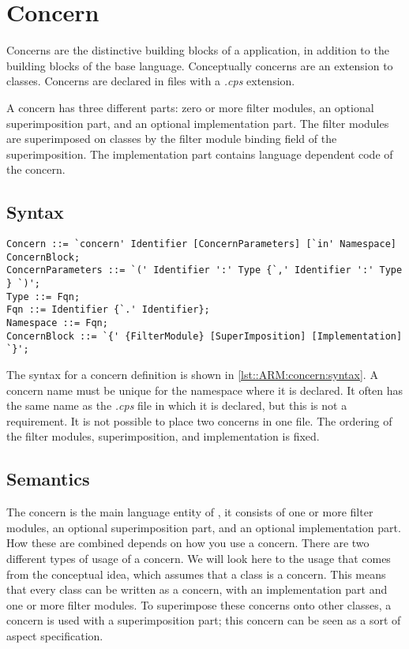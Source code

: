 \chapter{Concern} \label{chapter:concern}
Concerns are the distinctive building blocks of a \Compose* application, in addition to the building blocks of the base language. Conceptually concerns are an extension to classes.
Concerns are declared in files with a \emph{.cps} extension.

A concern has three different parts: zero or more filter modules, an optional superimposition part, and an optional implementation part. 
The filter modules are superimposed on classes by the filter module binding field of the superimposition. 
The implementation part contains language dependent code of the concern.

\section*{Syntax}
\begin{lstlisting}[caption = {Concern syntax}, label = lst::ARM:concern:syntax, style = listing, language = ebnf, float = tpb]
Concern ::= `concern' Identifier [ConcernParameters] [`in' Namespace] ConcernBlock;
ConcernParameters ::= `(' Identifier ':' Type {`,' Identifier ':' Type } `)';
Type ::= Fqn;
Fqn ::= Identifier {`.' Identifier};
Namespace ::= Fqn;
ConcernBlock ::= `{' {FilterModule} [SuperImposition] [Implementation] `}';
\end{lstlisting}
The syntax for a concern definition is shown in \autoref{lst::ARM:concern:syntax}. 
A concern name must be unique for the namespace where it is declared.
It often has the same name as the \emph{.cps} file in which it is declared, but this is not a requirement.
It is not possible to place two concerns in one file.
The ordering of the filter modules, superimposition, and implementation is fixed.

\section*{Semantics}
The concern is the main language entity of \Compose*, it consists of one or more filter modules, an optional superimposition part, and an optional implementation part. 
How these are combined depends on how you use a \Compose* concern. 
There are two different types of usage of a concern. 
We will look here to the usage that comes from the conceptual idea, which assumes that a class is a concern. 
This means that every class can be written as a concern, with an implementation part and one or more filter modules. 
To superimpose these concerns onto other classes, a concern is used with a superimposition part; this concern can be seen as a sort of aspect specification.

